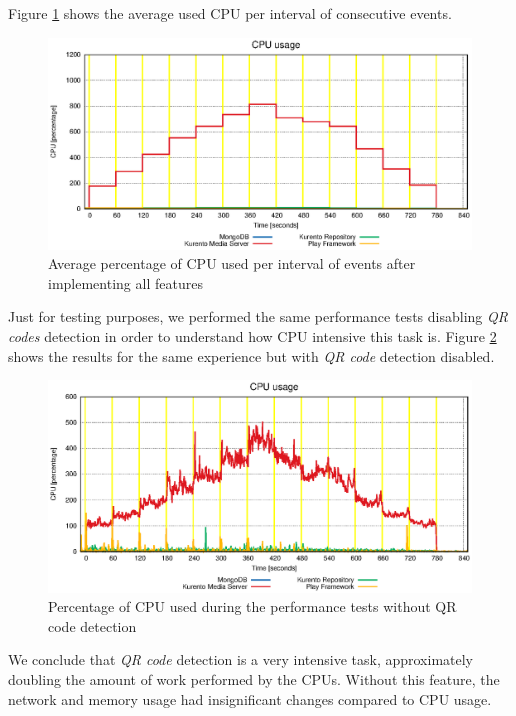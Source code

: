    Figure \ref{fig:summary_full_cpu} shows the average used \ac{CPU} per interval of consecutive events. 

\begin{figure}
  \centering
  \includegraphics[width=\textwidth]{stats/summary_full_cpu.eps}
  \caption{Average percentage of CPU used per interval of events after implementing all features}
  \label{fig:summary_full_cpu}
\end{figure}



  Just for testing purposes, we performed the same performance tests disabling \emph{QR codes} detection in order to understand how \ac{CPU} intensive this task is. Figure \ref{fig:test_without_qrcode_cpu} shows the results for the same experience but with \emph{QR code} detection disabled.

\begin{figure}
  \centering
  \includegraphics[width=\textwidth]{stats/test_without_qrcode_cpu.eps}
  \caption{Percentage of CPU used during the performance tests without QR code detection}
  \label{fig:test_without_qrcode_cpu}
\end{figure}

We conclude that \emph{QR code} detection is a very intensive task, approximately doubling the amount of work performed by the \ac{CPU}s. Without this feature, the network and memory usage had insignificant changes compared to \ac{CPU} usage.

